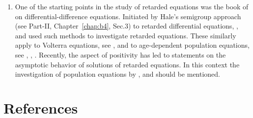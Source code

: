 \begin{enumerate}[label=\emph{Section 4.\arabic*:}, wide, itemsep=1ex]
It is well-known that semigroups play an important role in probability theory (\eg see \textcite{dynkin:1965}, \textcite{feller:1952} and \textcite{hillephillips:1957}).
A more detailed discussion than Example~\ref{ex:c4-2.8} is given in Chapter~2 of \textcite{vancasteren:1985}.

Convergence to periodic solutions is investigated in \textcite{kerschernagel:1984} and \textcite{nagel:1984} where Proposition~\ref{prop:c4-2.13} is proved.
The equation considered in Example~\ref{ex:c4-2.15} describes a linear model for cell division with exponential growth of individual cells.
The occurring phenomena are conjectured by \textcite{diekmannetal:1984}.

\item%
One of the starting points in the study of retarded equations was the book of \textcite{bellmancooke:1963} on differential-difference equations.
Initiated by Hale's semigroup approach (see Part-II, Chapter~\ref{chap:b4},  Sec.3) to retarded differential equations, \textcite{dysonvillella:1979}, \textcite{villellabressan:1985} and \textcite{webb:1977} used such methods to investigate retarded equations.
These similarly apply to Volterra equations, see \textcite{miller:1974}, \textcite{webb:1977} and to 
age-dependent population equations, see \textcite{pruess:1981}, \textcite{webb:1984}, \textcite{webb:1985a}.
Recently, the aspect of positivity has led to statements on the asymptotic behavior of solutions of retarded equations.
In this context the investigation of population equations by \textcite{greiner:1984}, \textcite{heijmans:1985a} and \textcite{webb:1985b} should be mentioned.

\end{enumerate}
\section*{References}
{\RaggedRight
  \printbibliography[heading=none]
 }
